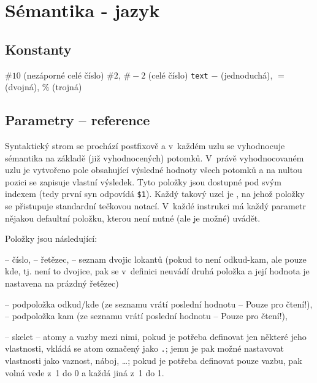 \chapter{\label{priloha:jazyk}Sémantika - jazyk}

\newcommand{\prikaz}[1]{{\bf \item {\tt #1}}}


\section{Konstanty}
\begin{itemize}
	 {$\#10$} (nezáporné celé číslo)
	 {\tt $\#2$}, {\tt $\#-2$} (celé číslo)
	 {\tt {\til}text{\til}}
		{\tt $-$} (jednoduchá),
					{\tt $=$} (dvojná),
					{\tt $\%$} (trojná)
\end{itemize}

\section{Parametry -- reference}
Syntaktický strom se prochází postfixově a v~každém uzlu se vyhodnocuje
sémantika na základě (již vyhodnocených) potomků. V~právě vyhodnocovaném uzlu je
vytvořeno pole obsahující výsledné hodnoty všech potomků a na nultou pozici se
zapisuje vlastní výsledek. Tyto položky jsou dostupné pod svým indexem (tedy
první syn odpovídá {\tt \$1}). Každý takový uzel je , na jehož
položky se přistupuje standardní tečkovou notací. V~každé instrukci má každý
parametr nějakou defaultní položku, kterou není nutné (ale je možné) uvádět.

Položky jsou následující:
\begin{itemize}
	 -- číslo,
	 -- řetězec,
	 -- seznam dvojic lokantů (pokud to není odkud-kam, ale
				 pouze kde, tj. není to dvojice, pak se v~definici neuvádí druhá
				 položka a její hodnota je nastavena na prázdný řetězec)
				 \begin{itemize}
					 -- podpoložka odkud/kde (ze seznamu vrátí
									  poslední hodnotu -- Pouze pro čtení!),
					 -- podpoložka kam (ze seznamu vrátí
									  poslední hodnotu -- Pouze pro čtení!),
				 \end{itemize}
	 -- skelet -- atomy a vazby mezi nimi, pokud je potřeba
				 definovat jen některé jeho vlastnosti, vkládá se atom
				 označený jako {\tt {\til}.{\til}}; jemu je pak možné nastavovat
				 vlastnosti jako vaznost, náboj, \dots; pokud je potřeba
				 definovat pouze vazbu, pak volná vede z~1 do 0 a každá jiná
				 z~1 do 1.
\end{itemize}

